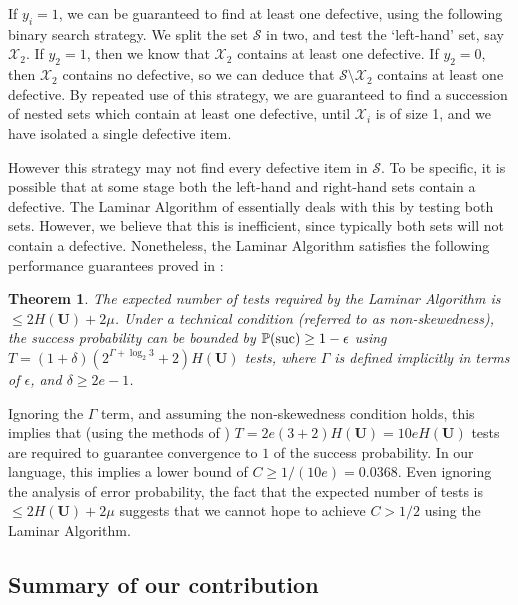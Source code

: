 \documentclass[conference]{IEEEtran}
\newtheorem{theorem}{Theorem}[section]
\newcommand{\vc}[1]{{\mathbf{ #1}}}
\newcommand{\pr}{{\mathbb{P}}}
\newcommand{\suc}{{\rm suc}}
\newcommand{\setS}{{\mathcal{S}}}
\newcommand{\setX}{{\mathcal{X}}}
\begin{document}
If $y_i = 1$, we can be guaranteed to find at least
one defective, using the following binary search strategy.  
We  split the   set $\setS$ in two, and test the `left-hand' set, say $\setX_{2}$. If $y_{2} = 1$, then we know that $\setX_{2}$ contains at least one defective.
If $y_{2} = 0$, then $\setX_{2}$ contains no defective, so we can deduce that $\setS \setminus \setX_2$ contains at least one defective. By repeated use of this strategy, we are 
guaranteed to find a succession of nested sets which contain at least one defective, until $\setX_i$ is of size 1, and we have isolated a single defective item.

However this strategy may not find every defective item in $\setS$. To be specific, it is possible that at some stage
both the left-hand and right-hand sets contain a defective. The Laminar Algorithm of \cite{li5} essentially deals with this by testing 
both sets. However, we believe that this is inefficient, since typically both sets will not contain a defective. Nonetheless, the Laminar Algorithm satisfies
 the following  performance guarantees  proved in \cite[Theorem 2]{li5}: 
%
\begin{theorem} \label{thm:lower}
The expected number of tests required by the Laminar Algorithm \cite{li5}  is $\leq 2 H(\vc{U}) + 2 \mu$. Under a technical condition (referred to as non-skewedness), the
success probability can be bounded by $\pr(\suc) \geq 1- \epsilon$ using $T = (1+ \delta) (2^{\Gamma + \log_2 3} + 2) H(\vc{U})$ tests, where $\Gamma$ is defined implicitly
in terms of $\epsilon$, and $\delta \geq 2 e - 1$.
\end{theorem}

Ignoring the $\Gamma$ term, and assuming the non-skewedness condition holds,
 this implies that (using the methods of \cite{li5}) $T =  2 e (3 + 2) H(\vc{U}) = 10 e H(\vc{U})$ tests are required to guarantee convergence to $1$
of the success probability. In our language, this implies a lower bound of $C \geq 1/(10 e) = 0.0368$. Even ignoring the analysis of error probability, the fact that the expected number
of tests is $\leq 2 H(\vc{U}) + 2 \mu$ suggests that we cannot hope to achieve $C > 1/2$ using the Laminar Algorithm.
%
\subsection{Summary of our contribution} \label{sec:algo}
\end{document}
